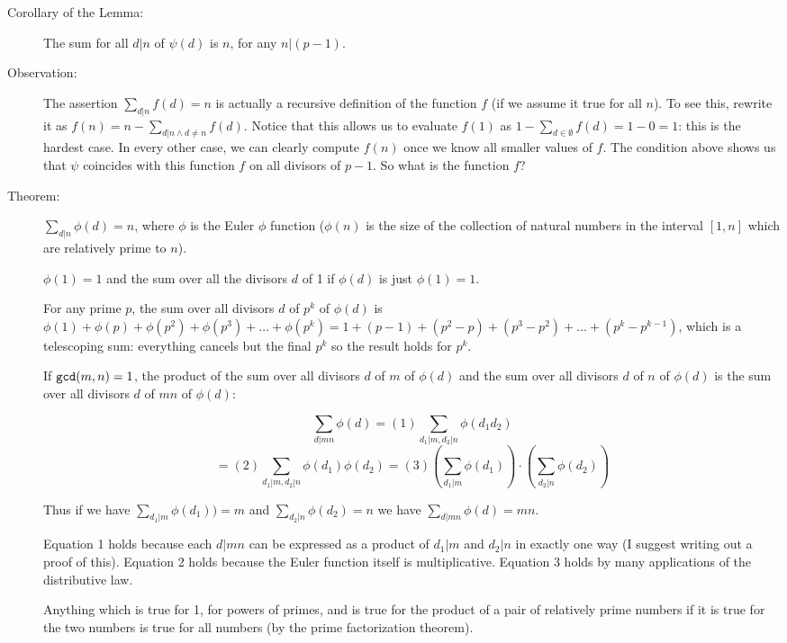 \documentclass[12pt]{article}
\begin{document}
\begin{description}
\item[Corollary of the Lemma:]  The sum for all $d|n$ of $\psi(d)$ is $n$, for any $n|(p-1)$.

\item[Observation:]   The assertion $\sum_{d|n}f(d)=n$ is actually a recursive definition of the function $f$ (if we assume it true for all $n$).   To see this, rewrite it as
$f(n)=n-\sum_{d|n \wedge d \neq n}f(d)$.  Notice that this allows us to evaluate $f(1)$ as $1-\sum_{d \in \emptyset}f(d)=1-0=1$:  this is the hardest case.   In every other case,
we can clearly compute $f(n)$ once we know all smaller values of $f$.   The condition above shows us that $\psi$ coincides with this function $f$ on all divisors of $p-1$.
So what is the function $f$?

\item[Theorem:]  $\sum_{d|n}\phi(d)=n$, where $\phi$ is the Euler $\phi$ function ($\phi(n)$ is the size of the collection of natural numbers in the interval $[1,n]$ which are relatively prime to $n$).

$\phi(1)=1$ and the sum over all the divisors $d$ of 1 if $\phi(d)$ is just $\phi(1)=1$.

For any prime $p$, the sum over all divisors $d$ of $p^k$ of $\phi(d)$ is $\phi(1) + \phi(p) + \phi(p^2)+\phi(p^3)+\ldots+\phi(p^k)=1+(p-1)+(p^2-p)+(p^3-p^2)+\ldots+(p^k-p^{k-1})$, which is a telescoping sum:  everything cancels but the final $p^k$ so the result holds for $p^k$.

If ${\tt gcd}(m,n)=1$, the  product of the sum over all divisors $d$ of $m$ of $\phi(d)$ and the sum over all divisors $d$ of $n$ of $\phi(d)$ is the sum over all divisors $d$ of $mn$ of $\phi(d)$:

$$\sum_{d|mn}\phi(d) =(1)  \sum_{d_1|m,d_2|n}\phi(d_1d_2) $$ $$=(2) \sum_{d_1|m,d_2|n}\phi(d_1)\phi(d_2) =(3) (\sum_{d_1|m}\phi(d_1))\cdot(\sum_{d_2|n}\phi(d_2))$$

Thus if we have $\sum_{d_1|m}\phi(d_1))=m$ and $\sum_{d_2|n}\phi(d_2)=n$ we have $\sum_{d|mn}\phi(d) =mn$.

Equation 1 holds because each $d|mn$ can be expressed as a product of $d_1|m$ and $d_2|n$ in exactly one way (I suggest writing out a proof of this).   Equation 2 holds because the Euler function itself
is multiplicative.   Equation 3 holds by many applications of the distributive law.

Anything which is true for 1, for powers of primes, and is true for the product of a pair of relatively prime numbers if it is true for the two numbers is true for all numbers (by the prime factorization theorem).


\end{description}
\end{document}
